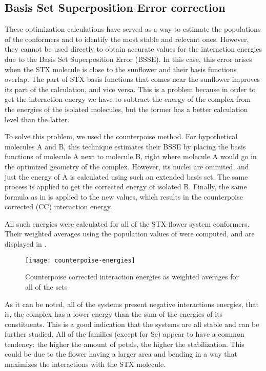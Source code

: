 \subsection{Basis Set Superposition Error correction}
These optimization calculations have served as a way to estimate the populations of the conformers and to identify the most stable and relevant ones.
However, they cannot be used directly to obtain accurate values for the interaction energies due to the Basis Set Superposition Error (BSSE).
In this case, this error arises when the STX molecule is close to the sunflower and their basis functions overlap.
The part of STX basis functions that comes near the sunflower improves its part of the calculation, and vice versa.
This is a problem because in order to get the interaction energy we have to subtract the energy of the complex from the energies of the isolated molecules, but the former has a better calculation level than the latter.

To solve this problem, we used the counterpoise method.
For hypothetical molecules A and B, this technique estimates their BSSE by placing the basis functions of molecule A next to molecule B, right where molecule A would go in the optimized geometry of the complex.
However, its nuclei are ommited, and just the energy of A is calculated using such an extended basis set.
The same process is applied to get the corrected energy of isolated B.
Finally, the same formula as in  is applied to the new values, which results in the counterpoise corrected (CC) interaction energy.

All such energies were calculated for all of the STX-flower system conformers.
Their weighted averages using the population values of  were computed, and are displayed in .

\begin{figure}
    \texttt{[image: counterpoise-energies]}
    \caption[Counterpoise corrected interaction energies]{Counterpoise corrected interaction energies as weighted averages for all of the sets}
\end{figure}

As it can be noted, all of the systems present negative interactions energies, that is, the complex has a lower energy than the sum of the energies of its constituents.
This is a good indication that the systems are all stable and can be further studied.
All of the families (except for Se) appear to have a common tendency: the higher the amount of petals, the higher the stabilization. This could be due to the flower having a larger area and bending in a way that maximizes the interactions with the STX molecule.

